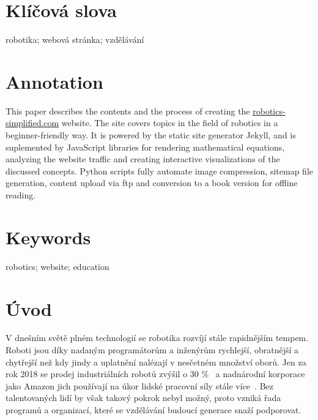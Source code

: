 \documentclass[a4paper, 12pt]{article}
\begin{document}
  \section*{\normalfont\textbf{Klíčová slova}}
  robotika; webová stránka; vzdělávání

  \section*{\normalfont\textbf{Annotation}}
  This paper describes the contents and the process of creating the \url{robotics-simplified.com} website. The site covers topics in the field of robotics in a beginner-friendly way. It is powered by the static site generator Jekyll, and is suplemented by JavaScript libraries for rendering mathematical equations, analyzing the website traffic and creating interactive visualizations of the discussed concepts. Python scripts fully automate image compression, sitemap file generation, content upload via \acrshort{ftp} and conversion to a book version for offline reading.

  \section*{\normalfont\textbf{Keywords}}
  robotics; website; education

  \newpage

  \setcounter{savepage}{\value{page}}%


  \tableofcontents

  \newpage

  \printglossary[type=\acronymtype, title=Seznam zkratek]

  \newpage

  \section{Úvod}
  V dnešním světě plném technologií se robotika rozvíjí stále rapidnějším tempem. Roboti jsou díky nadaným programátorům a inženýrům rychlejší, obratnější a chytřejší než kdy jindy a uplatnění nalézají v nesčetném množství oborů. Jen za rok 2018 se prodej industriálních robotů zvýšil o 30 \%~\cite{industrial-robot-growth} a nadnárodní korporace jako Amazon jich používají na úkor lidské pracovní síly stále více~\cite{amazon-hiring}. Bez talentovaných lidí by však takový pokrok nebyl možný, proto vzniká řada programů a organizací, které se vzdělávání budoucí generace snaží podporovat.
\end{document}
